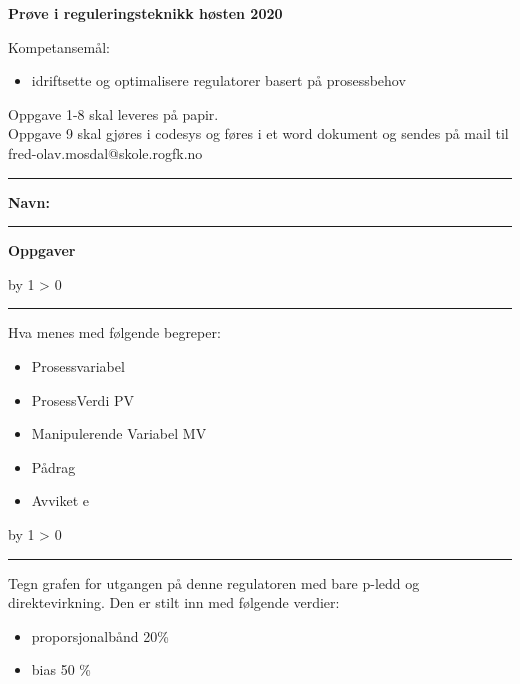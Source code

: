 \documentclass[12pt,a4paper]{article}
\def\oppgave{
            \advance\questnum by 1
            \ifnum \questnum > 0
                 \hrule
                 \vskip 3pt
                 \leftline{Oppgave \the\questnum}
                 \vskip 3pt \fi}
\begin{document}
\centerline{\bf Prøve i reguleringsteknikk høsten 2020}  \bigskip

Kompetansemål:
\begin{itemize}[noitemsep]

	\item idriftsette og optimalisere regulatorer basert på prosessbehov
\end{itemize}

Oppgave 1-8 skal leveres på papir. \\
Oppgave 9 skal gjøres i codesys og føres i et word  dokument og sendes på mail til fred-olav.mosdal@skole.rogfk.no\\

\bigskip 
\hrule
\bigskip 
\textbf{Navn:}\bigskip 
\hrule
\vfil \eject
\vfil \eject
\vfil \eject
\centerline{\bf Oppgaver}
\vskip 5pt
\oppgave{} 

Hva menes med følgende begreper:

\begin{itemize}
\item Prosessvariabel
\item ProsessVerdi PV 
\item Manipulerende Variabel MV
\item Pådrag 
\item Avviket e 
\end{itemize}


\vfil

\eject
{}
\vskip 10pt \filbreak 
\oppgave{} 

Tegn grafen for utgangen  på denne regulatoren med bare p-ledd og direktevirkning. Den er stilt inn med følgende verdier:
\begin{itemize}[noitemsep]
	\item proporsjonalbånd 20\%
	\item bias 50 \%
\end{itemize}
\end{document}
